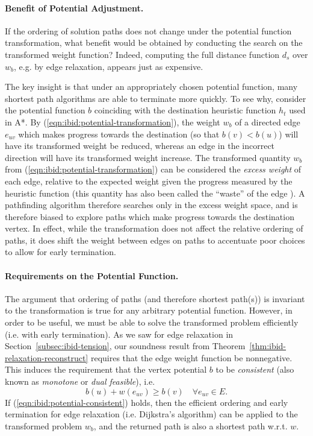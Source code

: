 \paragraph{Benefit of Potential Adjustment.}
If the ordering of solution paths does not change under the
potential function transformation,
what benefit would be obtained by conducting the search
on the transformed weight function?
Indeed,
computing the full distance function $d_s$ over $w_b$,
e.g. by edge relaxation,
appears just as expensive.

The key insight is that under an appropriately chosen potential function,
many shortest path algorithms are able to terminate more quickly.
To see why,
consider the potential function $b$ coinciding with
the destination heuristic function $h_t$ used in A*.
By (\ref{eqn:ibid:potential-transformation}),
the weight $w_b$ of a directed edge $e_{uv}$ which makes
progress towards the destination (so that $b(v) < b(u)$)
will have its transformed weight be reduced,
whereas an edge in the incorrect direction will have its transformed
weight increase.
The transformed quantity $w_b$
from (\ref{eqn:ibid:potential-transformation})
can be considered the \emph{excess weight} of each edge,
relative to the expected weight given the progress measured by the
heuristic function
(this quantity has also been called the ``waste'' of the edge
\citep{pohl1969bidirectional}).
A pathfinding algorithm therefore searches only in the excess weight
space,
and is therefore biased to explore paths which make progress towards
the destination vertex.
In effect,
while the transformation does not affect the relative ordering of
paths,
it does shift the weight between edges on paths to accentuate poor
choices to allow for early termination.

\paragraph{Requirements on the Potential Function.}
The argument that ordering of paths (and therefore shortest path(s))
is invariant to the transformation is true for any arbitrary
potential function.
However,
in order to be useful,
we must be able to solve the transformed problem efficiently
(i.e. with early termination).
As we saw for edge relaxation in Section~\ref{subsec:ibid-tension},
our soundness result from Theorem~\ref{thm:ibid-relaxation-reconstruct}
requires that the edge weight function be nonnegative.
This induces the requirement that
the vertex potential $b$ to be \emph{consistent}
(also known as \emph{monotone} or \emph{dual feasible}), i.e.
\begin{equation}
   b(u) + w(e_{uv}) \geq b(v) \quad\forall e_{uv} \in E.
   \label{eqn:ibid:potential-consistent}
\end{equation}
If (\ref{eqn:ibid:potential-consistent}) holds,
then the efficient ordering and early termination
for edge relaxation (i.e. Dijkstra's algorithm)
can be applied to the transformed problem $w_b$,
and the returned path is also a shortest path w.r.t. $w$. 

